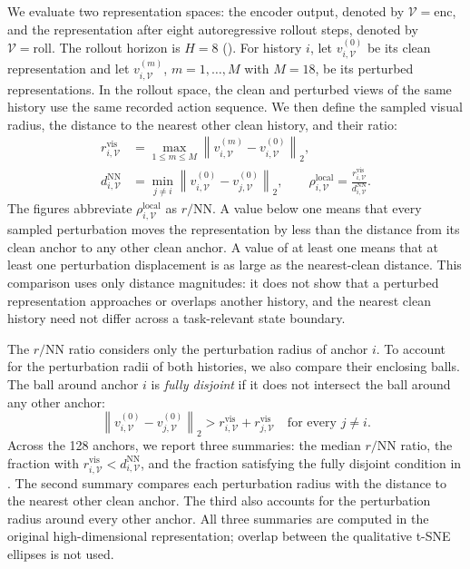 \documentclass[10pt]{article}
\begin{document}
We evaluate two representation spaces: the encoder output, denoted by
$\mathcal V=\mathrm{enc}$, and the representation after eight autoregressive
rollout steps, denoted by $\mathcal V=\mathrm{roll}$. The rollout horizon is
$H=8$ (). For history $i$, let
$v_{i,\mathcal V}^{(0)}$ be its clean representation and let
$v_{i,\mathcal V}^{(m)}$, $m=1,\ldots,M$ with $M=18$, be its perturbed
representations. In the rollout space, the clean and perturbed views of the
same history use the same recorded action sequence. We then define the sampled
visual radius, the distance to the nearest other clean history, and their ratio:
\begin{align}
r_{i,\mathcal V}^{\mathrm{vis}}
&=\max_{1\leq m\leq M}
\left\|v_{i,\mathcal V}^{(m)}-v_{i,\mathcal V}^{(0)}\right\|_2,
\nonumber\\
d_{i,\mathcal V}^{\mathrm{NN}}
&=\min_{j\neq i}
\left\|v_{i,\mathcal V}^{(0)}-v_{j,\mathcal V}^{(0)}\right\|_2,
\qquad
\rho_{i,\mathcal V}^{\mathrm{local}}
=\frac{r_{i,\mathcal V}^{\mathrm{vis}}}
{d_{i,\mathcal V}^{\mathrm{NN}}}.
\label{eq:local-radius-spacing}
\end{align}
The figures abbreviate $\rho_{i,\mathcal V}^{\mathrm{local}}$ as
$r/\mathrm{NN}$. A value below one means that every sampled perturbation moves
the representation by less than the distance from its clean anchor to any
other clean anchor. A value of at least one means that at least one
perturbation displacement is as large as the nearest-clean distance. This
comparison uses only distance magnitudes: it does not show that a perturbed
representation approaches or overlaps another history, and the nearest clean
history need not differ across a task-relevant state boundary.

The $r/\mathrm{NN}$ ratio considers only the perturbation radius of anchor
$i$. To account for the perturbation radii of both histories, we also compare
their enclosing balls. The ball around anchor $i$ is \emph{fully disjoint} if
it does not intersect the ball around any other anchor:
\begin{equation}
\left\|v_{i,\mathcal V}^{(0)}-v_{j,\mathcal V}^{(0)}\right\|_2
>
r_{i,\mathcal V}^{\mathrm{vis}}+r_{j,\mathcal V}^{\mathrm{vis}}
\quad\text{for every }j\neq i.
\label{eq:local-cloud-disjoint}
\end{equation}
Across the 128 anchors, we report three summaries: the median
$r/\mathrm{NN}$ ratio, the fraction with
$r_{i,\mathcal V}^{\mathrm{vis}}<d_{i,\mathcal V}^{\mathrm{NN}}$, and the
fraction satisfying the fully disjoint condition in
. The second summary compares each perturbation
radius with the distance to the nearest other clean anchor. The third also
accounts for the perturbation radius around every other anchor. All three
summaries are computed in the original high-dimensional representation;
overlap between the qualitative t-SNE ellipses is not used.
\end{document}
